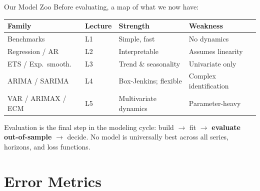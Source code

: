 \documentclass[aspectratio=169, 11pt]{beamer}
\begin{document}
\begin{frame}{Our Model Zoo}
  Before evaluating, a map of what we now have:
  \begin{center}
    {\small
    \begin{tabular}{llll}
      \toprule
      \textbf{Family} & \textbf{Lecture} & \textbf{Strength} & \textbf{Weakness} \\
      \midrule
      Benchmarks          & L1 & Simple, fast          & No dynamics \\
      Regression / AR     & L2 & Interpretable         & Assumes linearity \\
      ETS / Exp.\ smooth. & L3 & Trend \& seasonality  & Univariate only \\
      ARIMA / SARIMA      & L4 & Box-Jenkins; flexible & Complex identification \\
      VAR / ARIMAX / ECM  & L5 & Multivariate dynamics & Parameter-heavy \\
      \bottomrule
    \end{tabular}
    }
  \end{center}
  \begin{keybox}
    Evaluation is the final step in the modeling cycle:
    build $\to$ fit $\to$ \textbf{evaluate out-of-sample} $\to$ decide.
    No model is universally best across all series, horizons, and loss functions.
  \end{keybox}
\end{frame}

\section{Error Metrics}

\end{document}
